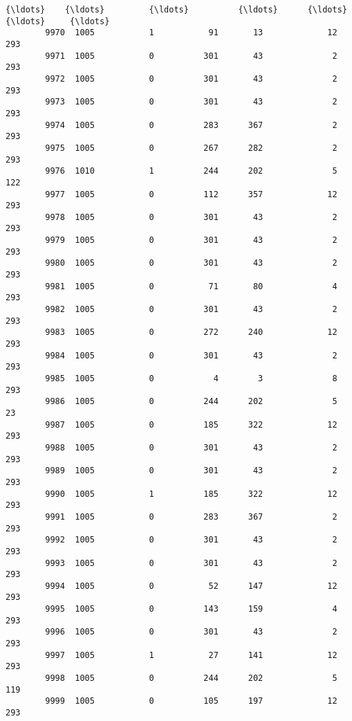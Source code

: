 \documentclass[11pt]{article}
\begin{document}
\begin{Verbatim}[commandchars=\\\{\}]
        {\ldots}    {\ldots}         {\ldots}          {\ldots}      {\ldots}            {\ldots}     {\ldots}   
        9970  1005           1           91       13             12     293   
        9971  1005           0          301       43              2     293   
        9972  1005           0          301       43              2     293   
        9973  1005           0          301       43              2     293   
        9974  1005           0          283      367              2     293   
        9975  1005           0          267      282              2     293   
        9976  1010           1          244      202              5     122   
        9977  1005           0          112      357             12     293   
        9978  1005           0          301       43              2     293   
        9979  1005           0          301       43              2     293   
        9980  1005           0          301       43              2     293   
        9981  1005           0           71       80              4     293   
        9982  1005           0          301       43              2     293   
        9983  1005           0          272      240             12     293   
        9984  1005           0          301       43              2     293   
        9985  1005           0            4        3              8     293   
        9986  1005           0          244      202              5      23   
        9987  1005           0          185      322             12     293   
        9988  1005           0          301       43              2     293   
        9989  1005           0          301       43              2     293   
        9990  1005           1          185      322             12     293   
        9991  1005           0          283      367              2     293   
        9992  1005           0          301       43              2     293   
        9993  1005           0          301       43              2     293   
        9994  1005           0           52      147             12     293   
        9995  1005           0          143      159              4     293   
        9996  1005           0          301       43              2     293   
        9997  1005           1           27      141             12     293   
        9998  1005           0          244      202              5     119   
        9999  1005           0          105      197             12     293   
        

\end{Verbatim}
\end{document}
